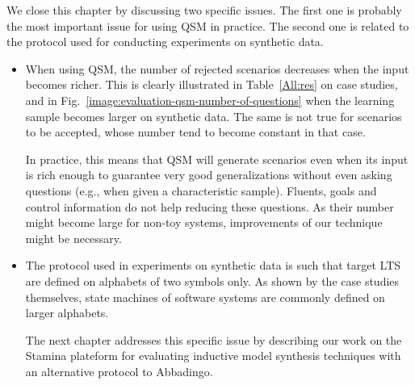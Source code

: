 We close this chapter by discussing two specific issues. The first one is probably the most important issue for using QSM in practice. The second one is related to the protocol used for conducting experiments on synthetic data. 

\begin{itemize}
\item When using QSM, the number of rejected scenarios decreases when the input becomes richer. This is clearly illustrated in Table~\ref{All:res} on case studies, and in Fig.~\ref{image:evaluation-qsm-number-of-questions} when the learning sample becomes larger on synthetic data. The same is not true for scenarios to be accepted, whose number tend to become constant in that case. 

In practice, this means that QSM will generate scenarios even when its input is rich enough to guarantee very good generalizations without even asking questions (e.g., when given a characteristic sample). Fluents, goals and control information do not help reducing these questions. As their number might become large for non-toy systems, improvements of our technique might be necessary.

\item The protocol used in experiments on synthetic data is such that target LTS are defined on alphabets of two symbols only. As shown by the case studies themselves, state machines of software systems are commonly defined on larger alphabets. 

The next chapter addresses this specific issue by describing our work on the Stamina plateform for evaluating inductive model synthesis techniques with an alternative protocol to Abbadingo.
\end{itemize}
